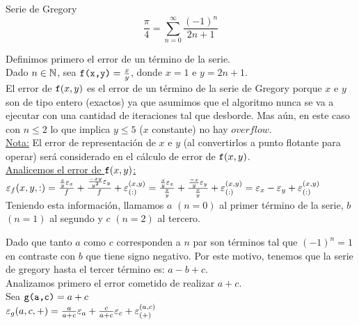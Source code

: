 \begin{subsubsection}{Serie de Gregory}
		\begin{equation*}
		\frac{\pi}{4} = \sum_{n=0}^{\infty} \frac{\left(-1\right)^n}{2n+1}
		\end{equation*}

	\VSP
	Definimos primero el error de un término de la serie.\\
		
	Dado $n \in \mathbb{N}$, sea $\texttt{f(x,y)}=\frac{x}{y}$, donde $x=1$ e $y=2n+1$.\\
	
	El error de $\texttt{f}(x,y)$ es el error de un término de la serie de Gregory porque $x$ e $y$ son de tipo entero (exactos) ya que asumimos que el algoritmo
	nunca se va a ejecutar con una cantidad de iteraciones tal que desborde. Mas aún, en este caso con $n \leq 2$ lo que implica $y \leq 5$ ($x$ constante) no hay $overflow$.\\
	
	\underline{Nota:} El error de representación de $x$ e $y$ (al convertirlos a punto flotante para operar) será considerado en el cálculo de error de $\texttt{f}(x,y)$.\\
	
	\underline{Analicemos el error de $\texttt{f}(x,y)$:}\\
	
	$\texttt{$\varepsilon _{f}({x,y,:})$}=\frac{\frac{x}{y}\varepsilon _{x}}{f} + \frac{\frac{-xy}{y^2}\varepsilon _{y}}{f} + \varepsilon _{({:})}^{({x,y})} = 
	\frac{\frac{x}{y}\varepsilon _{x}}{\frac{x}{y}} + \frac{\frac{-x}{y}\varepsilon _{y}}{\frac{x}{y}} + \varepsilon _{({:})}^{({x,y})} = \varepsilon _{x} - \varepsilon _{y} + \varepsilon _{({:})}^{({x,y})}$\\
	
	Teniendo esta información, llamamos $a$ $(n=0)$ al primer término de la serie, $b$ $(n=1)$ al segundo y $c$ $(n=2)$ al tercero.
	
	Dado que tanto $a$ como $c$ corresponden a $n$ par son términos tal que $(-1)^n = 1$ en contraste con $b$ que tiene signo negativo. Por este motivo,
	tenemos que la serie de gregory hasta el tercer término es: $a - b + c$.\\
	
	Analizamos primero el error cometido de realizar $a+c$.\\
	
	Sea $\texttt{g(a,c)}=a+c$\\
	
	$\varepsilon _{g}({a,c,+}) = \frac{a}{a+c}\varepsilon _{a} + \frac{c}{a+c}\varepsilon _{c} + \varepsilon _{({+})}^{({a,c})}$\\
	

\end{subsubsection}
